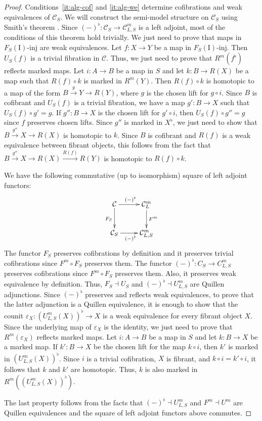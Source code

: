 \documentclass[reqno]{amsart}
\theoremstyle{definition}
\theoremstyle{remark}
\newcommand{\fs}[1]{\mathrm{#1}}
\newcommand{\cat}[1]{\mathcal{#1}}
\newcommand{\C}{\cat{C}}
\newcommand{\I}{\fs{I}}
\newcommand{\class}[2]{#1\text{-}\mathrm{#2}}
\newcommand{\Iinj}[1][\I]{\class{#1}{inj}}
\numberwithin{figure}{section}
\begin{document}
\begin{proof}
Conditions~\eqref{it:alg-cof} and \eqref{it:alg-we} determine cofibrations and weak equivalences of $\C_S$.
We will construct the semi-model structure on $\C_S$ using Smith's theorem \cite[Theorem~3.1]{semi-smith}.
Since $(-)^\flat : \C_S \to \C^m_{L,S}$ is a left adjoint, most of the conditions of this theorem hold trivially.
We just need to prove that maps in $\Iinj[F_S(\I)]$ are weak equivalences.
Let $f : X \to Y$ be a map in $\Iinj[F_S(\I)]$.
Then $U_S(f)$ is a trivial fibration in $\C$.
Thus, we just need to prove that $R^m(f^\flat)$ reflects marked maps.
Let $i : A \to B$ be a map in $S$ and let $k : B \to R(X)$ be a map such that $R(f) \circ k$ is marked in $R^m(Y)$.
Then $R(f) \circ k$ is homotopic to a map of the form $B \xrightarrow{g} Y \to R(Y)$, where $g$ is the chosen lift for $g \circ i$.
Since $B$ is cofibrant and $U_S(f)$ is a trivial fibration, we have a map $g' : B \to X$ such that $U_S(f) \circ g' = g$.
If $g'' : B \to X$ is the chosen lift for $g' \circ i$, then $U_S(f) \circ g'' = g$ since $f$ preserves chosen lifts.
Since $g''$ is marked in $X^\flat$, we just need to show that $B \xrightarrow{g''} X \to R(X)$ is homotopic to $k$.
Since $B$ is cofibrant and $R(f)$ is a weak equivalence between fibrant objects, this follows from the fact that $B \xrightarrow{g''} X \to R(X) \xrightarrow{R(f)} R(Y)$ is homotopic to $R(f) \circ k$.

We have the following commutative (up to isomorphism) square of left adjoint functors:
\[ \xymatrix{ \C \ar[r]^{(-)^\flat} \ar[d]_{F_S} & \C^m_L \ar[d]^{F^m} \\
              \C_S \ar[r]_{(-)^\flat}            & \C^m_{L,S}
            } \]
The functor $F_S$ preserves cofibrations by definition and it preserves trivial cofibrations since $F^m \circ F_S$ preserves them.
The functor $(-)^\flat : C_S \to C^m_{L,S}$ preserves cofibrations since $F^m \circ F_S$ preserves them.
Also, it preserves weak equivalence by definition.
Thus, $F_S \dashv U_S$ and $(-)^\flat \dashv U^m_{L,S}$ are Quillen adjunctions.
Since $(-)^\flat$ preserves and reflects weak equivalences, to prove that the latter adjunction is a Quillen equivalence, it is enough to show that the counit $\varepsilon_X : (U^m_{L,S}(X))^\flat \to X$ is a weak equivalence for every fibrant object $X$.
Since the underlying map of $\varepsilon_X$ is the identity, we just need to prove that $R^m(\varepsilon_X)$ reflects marked maps.
Let $i : A \to B$ be a map in $S$ and let $k : B \to X$ be a marked map.
If $k' : B \to X$ be the chosen lift for the map $k \circ i$, then $k'$ is marked in $(U^m_{L,S}(X))^\flat$.
Since $i$ is a trivial cofibration, $X$ is fibrant, and $k \circ i = k' \circ i$, it follows that $k$ and $k'$ are homotopic.
Thus, $k$ is also marked in $R^m((U^m_{L,S}(X))^\flat)$.

The last property follows from the facts that $(-)^\flat \dashv U^m_{L,S}$ and $F^m \dashv U^m$ are Quillen equivalences and the square of left adjoint functors above commutes.
\end{proof}
\end{document}
